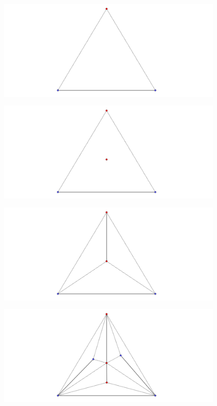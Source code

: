 \documentclass{beamer}
\begin{document}
\begin{frame}
\begin{figure}[h]
\includegraphics[width=\textwidth]{Tokunaga}
\end{figure}
\end{frame}
\begin{frame}
\begin{figure}[h]
\includegraphics[width=\textwidth]{Tokunaga-2}
\end{figure}
\end{frame}
\begin{frame}
\begin{figure}[h]
\includegraphics[width=\textwidth]{Tokunaga-3}
\end{figure}
\end{frame}
\begin{frame}
\begin{figure}[h]
\includegraphics[width=\textwidth]{Tokunaga-4}
\end{figure}
\end{frame}
\end{document}
